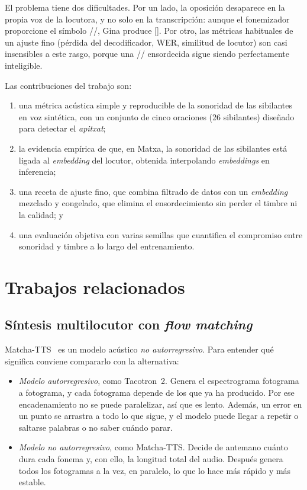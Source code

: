 \documentclass[conference]{IEEEtran}
\newcommand{\fz}{\textipa{z}}
\newcommand{\fs}{\textipa{s}}
\begin{document}
El problema tiene dos dificultades. Por un lado, la oposición desaparece en la propia voz de la locutora, y no solo en la transcripción: aunque el fonemizador proporcione el símbolo /\fz/, Gina produce [\fs]. Por otro, las métricas habituales de un ajuste fino (pérdida del decodificador, WER, similitud de locutor) son casi insensibles a este rasgo, porque una /\fz/ ensordecida sigue siendo perfectamente inteligible.

Las contribuciones del trabajo son:
\begin{enumerate}
\item una métrica acústica simple y reproducible de la sonoridad de las sibilantes en voz sintética, con un conjunto de cinco oraciones (26 sibilantes) diseñado para detectar el \textit{apitxat};
\item la evidencia empírica de que, en Matxa, la sonoridad de las sibilantes está ligada al \textit{embedding} del locutor, obtenida interpolando \textit{embeddings} en inferencia;
\item una receta de ajuste fino, que combina filtrado de datos con un \textit{embedding} mezclado y congelado, que elimina el ensordecimiento sin perder el timbre ni la calidad; y
\item una evaluación objetiva con varias semillas que cuantifica el compromiso entre sonoridad y timbre a lo largo del entrenamiento.
\end{enumerate}

\section{Trabajos relacionados}

\subsection{Síntesis multilocutor con \textit{flow matching}}
Matcha-TTS~\cite{mehta2024matcha} es un modelo acústico \emph{no autorregresivo}. Para entender qué significa conviene compararlo con la alternativa:
\begin{itemize}
\item \emph{Modelo autorregresivo}, como Tacotron~2. Genera el espectrograma fotograma a fotograma, y cada fotograma depende de los que ya ha producido. Por ese encadenamiento no se puede paralelizar, así que es lento. Además, un error en un punto se arrastra a todo lo que sigue, y el modelo puede llegar a repetir o saltarse palabras o no saber cuándo parar.
\item \emph{Modelo no autorregresivo}, como Matcha-TTS. Decide de antemano cuánto dura cada fonema y, con ello, la longitud total del audio. Después genera todos los fotogramas a la vez, en paralelo, lo que lo hace más rápido y más estable.
\end{itemize}
\end{document}
